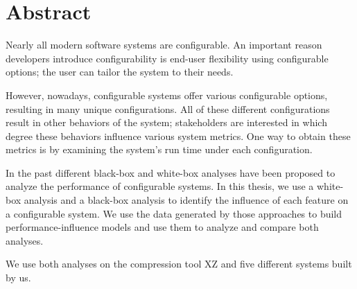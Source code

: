 \begingroup
\let\clearpage\relax
\let\cleardoublepage\relax
\let\cleardoublepage\relax

\chapter*{Abstract}
Nearly all modern software systems are configurable. An important reason developers introduce configurability is end-user flexibility using configurable options; 
the user can tailor the system to their needs. 

However, nowadays, configurable systems offer various configurable options, resulting in many unique configurations. 
All of these different configurations result in other behaviors of the system; stakeholders are interested in which degree 
these behaviors influence various system metrics. One way to obtain these metrics is by examining the system's run time under each configuration. 
 
In the past different black-box and white-box analyses have been proposed to analyze the performance of configurable systems. In this 
thesis, we use a white-box analysis and a black-box analysis to identify the influence of each feature on a configurable system.
We use the data generated by those approaches to build performance-influence models and use them to analyze and compare both analyses. 

We use both analyses on the compression tool \textsc{XZ} and five different systems built by us.  %

\vfill

\endgroup

\vfill
